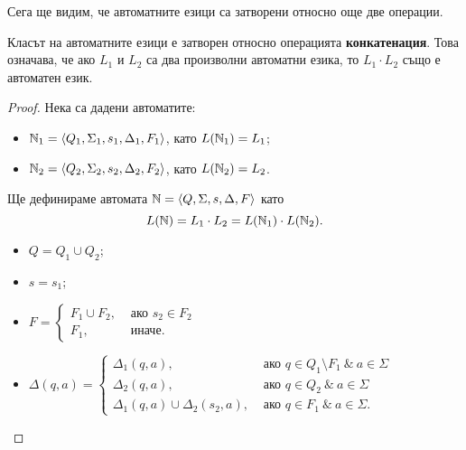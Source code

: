 Сега ще видим, че автоматните езици  са затворени относно още две операции.
\begin{lemma}
  Класът на автоматните езици е затворен относно операцията {\bf конкатенация}.
  Това означава, че ако $L_1$ и $L_2$ са два произволни автоматни езика, то $L_1\cdot L_2$
  също е автоматен език.
\end{lemma}
\begin{proof}
  Нека са дадени автоматите:
  \begin{itemize}
  \item
    $\mathbb{N}_1 = \langle{Q_1,\Sigma_1,s_1,\Delta_1,F_1}\rangle$, като $L(\mathbb{N}_1) = L_1$;
  \item
    $\mathbb{N}_2 = \langle{Q_2,\Sigma_2,s_2,\Delta_2,F_2}\rangle$, като $L(\mathbb{N}_2) = L_2$.
  \end{itemize}
  Ще дефинираме автомата $\mathbb{N} = \langle{Q,\Sigma,s,\Delta,F}\rangle$ като
  \[L(\mathbb{N}) = L_1\cdot L_2 = L(\mathbb{N}_1)\cdot L(\mathbb{N}_2).\]
  \begin{itemize}
  \item
    $Q = Q_1 \cup Q_2$;
  \item
    $s = s_1$;
  \item
    $F = 
    \begin{cases}
      F_1 \cup F_2, & \text{ ако } s_2 \in F_2\\
      F_1,          & \text{ иначе}.
    \end{cases}$
  \item 
    $\Delta(q,a) = 
    \begin{cases}
      \Delta_1(q,a),                      & \text{ ако }q\in Q_1\setminus F_1\ \&\ a\in\Sigma\\
      \Delta_2(q,a),                      & \text{ ако }q\in Q_2\ \&\ a\in\Sigma\\
      \Delta_1(q,a) \cup \Delta_2(s_2,a), & \text{ ако }q \in F_1\ \&\ a\in\Sigma.
    \end{cases}$
  \end{itemize}
\end{proof}

